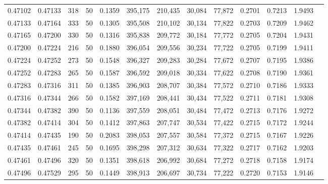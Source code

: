 \begin{tabular}{rrrrrrrrrrrrr}
0.47102 & 0.47133 &   318 &  50 &                                     0.1359 & 395,175 & 210,435 &  30,084 &  77,872 & 0.2701 & 0.7213 & 1.9493 \\
0.47133 & 0.47164 &   333 &  50 &                                     0.1305 & 395,508 & 210,102 &  30,134 &  77,822 & 0.2703 & 0.7209 & 1.9462 \\
0.47165 & 0.47200 &   330 &  50 &                                     0.1316 & 395,838 & 209,772 &  30,184 &  77,772 & 0.2705 & 0.7204 & 1.9431 \\
0.47200 & 0.47224 &   216 &  50 &                                     0.1880 & 396,054 & 209,556 &  30,234 &  77,722 & 0.2705 & 0.7199 & 1.9411 \\
0.47224 & 0.47252 &   273 &  50 &                                     0.1548 & 396,327 & 209,283 &  30,284 &  77,672 & 0.2707 & 0.7195 & 1.9386 \\
0.47252 & 0.47283 &   265 &  50 &                                     0.1587 & 396,592 & 209,018 &  30,334 &  77,622 & 0.2708 & 0.7190 & 1.9361 \\
0.47283 & 0.47316 &   311 &  50 &                                     0.1385 & 396,903 & 208,707 &  30,384 &  77,572 & 0.2710 & 0.7186 & 1.9333 \\
0.47316 & 0.47344 &   266 &  50 &                                     0.1582 & 397,169 & 208,441 &  30,434 &  77,522 & 0.2711 & 0.7181 & 1.9308 \\
0.47344 & 0.47382 &   390 &  50 &                                     0.1136 & 397,559 & 208,051 &  30,484 &  77,472 & 0.2713 & 0.7176 & 1.9272 \\
0.47382 & 0.47414 &   304 &  50 &                                     0.1412 & 397,863 & 207,747 &  30,534 &  77,422 & 0.2715 & 0.7172 & 1.9244 \\
0.47414 & 0.47435 &   190 &  50 &                                     0.2083 & 398,053 & 207,557 &  30,584 &  77,372 & 0.2715 & 0.7167 & 1.9226 \\
0.47435 & 0.47461 &   245 &  50 &                                     0.1695 & 398,298 & 207,312 &  30,634 &  77,322 & 0.2717 & 0.7162 & 1.9203 \\
0.47461 & 0.47496 &   320 &  50 &                                     0.1351 & 398,618 & 206,992 &  30,684 &  77,272 & 0.2718 & 0.7158 & 1.9174 \\
0.47496 & 0.47529 &   295 &  50 &                                     0.1449 & 398,913 & 206,697 &  30,734 &  77,222 & 0.2720 & 0.7153 & 1.9146 \\

\end{tabular}
